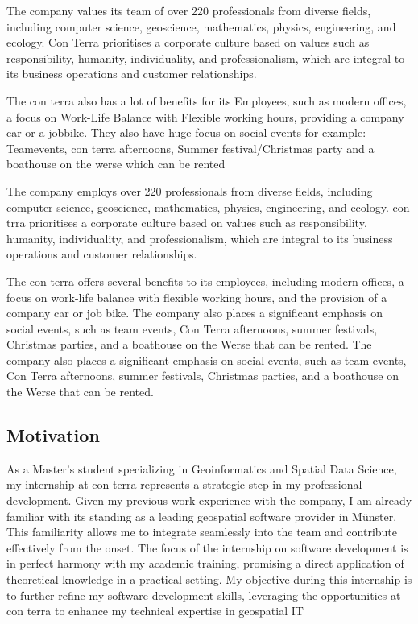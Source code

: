 \documentclass[11pt, titlepage, a4paper]{article}
\begin{document}
The company values its team of over 220 professionals from diverse fields, including computer science, geoscience, mathematics, physics, engineering, and ecology. Con Terra prioritises a corporate culture based on values such as responsibility, humanity, individuality, and professionalism, which are integral to its business operations and customer relationships.

The con terra also has a lot of benefits for its Employees, such as modern offices, a focus on Work-Life Balance with Flexible working hours, providing a company car or a jobbike. They also have huge focus on social events for example: Teamevents, con terra afternoons, Summer festival/Christmas party and a boathouse on the werse which can be rented


The company employs over 220 professionals from diverse fields, including computer science, geoscience, mathematics, physics, engineering, and ecology. con trra prioritises a corporate culture based on values such as responsibility, humanity, individuality, and professionalism, which are integral to its business operations and customer relationships.

The con terra offers several benefits to its employees, including modern offices, a focus on work-life balance with flexible working hours, and the provision of a company car or job bike. The company also places a significant emphasis on social events, such as team events, Con Terra afternoons, summer festivals, Christmas parties, and a boathouse on the Werse that can be rented. The company also places a significant emphasis on social events, such as team events, Con Terra afternoons, summer festivals, Christmas parties, and a boathouse on the Werse that can be rented.





\subsection{Motivation}
As a Master’s student specializing in Geoinformatics and Spatial Data Science, my internship at con terra represents a strategic step in my professional development. Given my previous work experience with the company, I am already familiar with its standing as a leading geospatial software provider in Münster. This familiarity allows me to integrate seamlessly into the team and contribute effectively from the onset. The focus of the internship on software development is in perfect harmony with my academic training, promising a direct application of theoretical knowledge in a practical setting. My objective during this internship is to further refine my software development skills, leveraging the opportunities at con terra to enhance my technical expertise in geospatial IT
\end{document}
